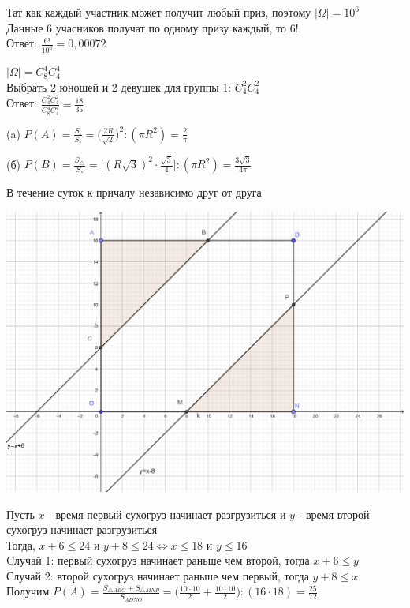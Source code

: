\begin{exercise}[12]
	Тат как каждый участник может получит любый приз, поэтому $| \Omega | = 10^6$ \\ Данные 6 учасников получат по одному призу каждый, то $6!$ \\ Ответ: $\frac{6!}{10^6} = 0,00072$
\end{exercise}

\begin{exercise}[13]
	$| \Omega | = C^4_8 C^4_4$ \\ Выбрать 2 юношей и 2 девушек для группы 1: $C^2_4 C^2_4$ \\ Ответ: $\frac{C^2_4 C^2_4}{C^4_8 C^4_4} = \frac{18}{35}$
\end{exercise}

\begin{exercise}[14]
	\item [(a)] $P(A) = \frac{S_{\square}}{S_{\circ}} = \Big(\frac{2R}{\sqrt{2}}\Big)^2:(\pi R^2) = \frac{2}{\pi}$
	\item [(б)] $P(B) = \frac{S_{\triangle}}{S_{\circ}} = \Big[(R \sqrt{3})^2 \cdot \frac{\sqrt{3}}{4}\Big] : (\pi R^2) = \frac{3 \sqrt{3}}{4 \pi}$
\end{exercise}

\begin{exercise}[15] В течение суток к причалу независимо друг от друга
	
	\includegraphics[width=\textwidth]{exercise15-2.png}
	
	Пусть $x$ - время первый сухогруз начинает разгрузиться и $y$ - время второй сухогруз начинает разгрузиться \\ Тогда, $x+6 \leq 24$ и $y+8 \leq 24 \Leftrightarrow x \leq 18$ и $y \leq 16$ \\ Cлучай 1: первый сухогруз начинает раньше чем второй, тогда $x+6 \leq y$ \\ Случай 2: второй сухогруз начинает раньше чем первый, тогда $y+8 \leq x$ \\ Получим $P(A) = \frac{S_{\triangle ABC} + S_{\triangle MNP}}{S_{ADNO}} = \Big(\frac{10 \cdot 10}{2} + \frac{10 \cdot 10}{2} \Big) : (16 \cdot 18) = \frac{25}{72}$ 
\end{exercise}